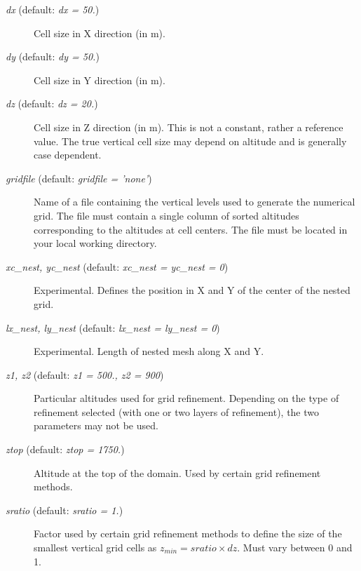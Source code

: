 \documentclass[12pt,A4,french]{article}
\begin{document}
\begin{description}

\item[{\it dx} (default: {\it dx = 50.})]

Cell size in X direction (in m).

\item[{\it dy} (default: {\it dy = 50.})]

Cell size in Y direction (in m).

\item[{\it dz} (default: {\it dz = 20.})]

Cell size in Z direction (in m). This is not a constant, rather a reference value. The true vertical cell size may depend on altitude and is generally case dependent.

\item[{\it gridfile} (default: {\it gridfile = 'none'})]

Name of a file containing the vertical levels used to generate the numerical grid. The file must contain a single column of sorted altitudes corresponding to the altitudes at cell centers. The file must be located in your local working directory.

\item[{\it xc\_nest, yc\_nest} (default: {\it xc\_nest = yc\_nest = 0})]

Experimental. Defines the position in X and Y of the center of the nested grid.

\item[{\it lx\_nest, ly\_nest} (default: {\it lx\_nest = ly\_nest = 0})]

Experimental. Length of nested mesh along X and Y.

\item[{\it z1, z2} (default: {\it z1 = 500., z2 = 900})]

Particular altitudes used for grid refinement. Depending on the type of refinement selected (with one or two layers of refinement), the two parameters may not be used.

\item[{\it ztop} (default: {\it ztop = 1750.})]

Altitude at the top of the domain. Used by certain grid refinement methods.

\item[{\it sratio} (default: {\it sratio = 1.})]

Factor used by certain grid refinement methods to define the size of the smallest vertical grid cells as $z_{min} = sratio \times dz$. Must vary between 0 and 1.


\end{description}
\end{document}
